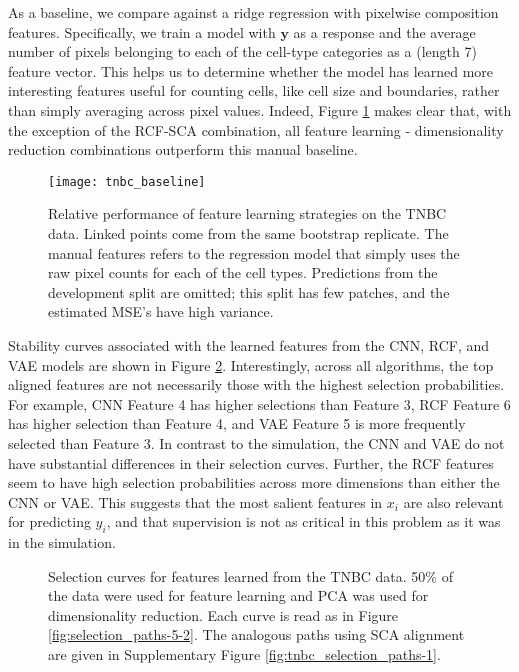 As a baseline, we compare against a ridge regression with pixelwise composition
features. Specifically, we train a model with $\mathbf{y}$ as a response and the
average number of pixels belonging to each of the cell-type categories as a
(length 7) feature vector. This helps us to determine whether the model has
learned more interesting features useful for counting cells, like cell size and
boundaries, rather than simply averaging across pixel values. Indeed, Figure
\ref{fig:tnbc_baseline} makes clear that, with the exception of the RCF-SCA
combination, all feature learning - dimensionality reduction combinations
outperform this manual baseline.

\begin{figure}
  \centering
  \texttt{[image: tnbc\_baseline]}
  \caption{Relative performance of feature learning strategies on the TNBC data.
    Linked points come from the same bootstrap replicate. The manual features
    refers to the regression model that simply uses the raw pixel counts for
    each of the cell types. Predictions from the development split are omitted;
    this split has few patches, and the estimated MSE's have high variance.}
  \label{fig:tnbc_baseline}
\end{figure}

Stability curves associated with the learned features from the CNN, RCF, and VAE
models are shown in Figure \ref{fig:tnbc_selection_paths-2}. Interestingly,
across all algorithms, the top aligned features are not necessarily those with
the highest selection probabilities. For example, CNN Feature 4 has higher
selections than Feature 3, RCF Feature 6 has higher selection than Feature 4,
and VAE Feature 5 is more frequently selected than Feature 3. In contrast to the
simulation, the CNN and VAE do not have substantial differences in their
selection curves. Further, the RCF features seem to have high selection
probabilities across more dimensions than either the CNN or VAE. This suggests
that the most salient features in $x_i$ are also relevant for predicting $y_i$,
and that supervision is not as critical in this problem as it was in the
simulation.

\begin{figure}
  \centering
  \caption{Selection curves for features learned from the TNBC data. 50\% of
    the data were used for feature learning and PCA was used for
    dimensionality reduction. Each curve is read as in Figure
    \ref{fig:selection_paths-5-2}. The analogous paths using SCA alignment are
    given in Supplementary Figure \ref{fig:tnbc_selection_paths-1}.}
  \label{fig:tnbc_selection_paths-2}
\end{figure}

